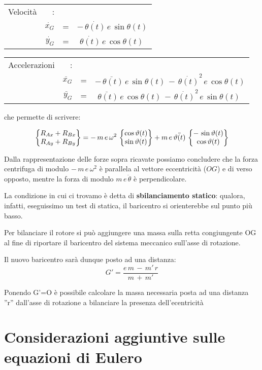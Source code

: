 \begin{minipage}{.5\textwidth}
\begin{tabular}{lrcl}
Velocità&:&&\\
&$\dot{x_G}$&=&$-\,\dot{\theta(t)}\,e\,\sin{\theta(t)}$\\
&$\dot{y_G}$&=&$\,\,\dot{\theta(t)}\,e\,\cos{\theta(t)}$\\
\end{tabular}
\end{minipage}
\hfill
\begin{minipage}{.5\textwidth}
\begin{tabular}{lrcl}
Accelerazioni&:&&\\
&$\ddot{x_G}$&=&$-\,\ddot{\theta(t)}\,e\,\sin{\theta(t)}\,-\,\dot{\theta(t)}^2\,e\,\cos{\theta(t)}$\\
&$\ddot{y_G}$&=&$\,\,\ddot{\theta(t)}\,e\,\cos{\theta(t)}\,-\,\dot{\theta(t)}^2\,e\,\sin{\theta(t)}$
\end{tabular}
\end{minipage}
\vspace{1mm}

che permette di scrivere:

\[
\begin{Bmatrix}R_{Ax} + R_{Bx}\\R_{Ay} + R_{By}\end{Bmatrix} = -\,m\,e\,\omega^2\,\begin{Bmatrix}\cos{\vartheta(t)}\\\sin{\vartheta(t)}\end{Bmatrix} + m\,e\,\ddot{\vartheta(t)}\,\begin{Bmatrix}-\,\sin{\vartheta(t)}\\\cos{\vartheta(t)}\end{Bmatrix}
\]

Dalla rappresentazione delle forze sopra ricavate possiamo concludere che la forza centrifuga di modulo $-\,m \,e\,\omega^2$ è parallela al vettore eccentricità ($OG$) e di verso opposto, mentre la forza di modulo $m\,e\,\ddot{\theta}$ è perpendicolare.

La condizione in cui ci trovamo è detta di \textbf{sbilanciamento statico}: qualora, infatti, eseguissimo un test di statica, il baricentro si orienterebbe sul punto più basso.

Per bilanciare il rotore si può aggiungere una massa sulla retta congiungente OG al fine di riportare il baricentro del sistema meccanico sull'asse di rotazione.

Il nuovo baricentro sarà dunque posto ad una distanza:
\[G' = \dfrac{e\,m\,-\,m'\,r}{m\,+\,m'}\]

Ponendo G'=O è possibile calcolare la massa necessaria posta ad una distanza ''r'' dall'asse di rotazione a bilanciare la presenza dell'ecentricità

\section{Considerazioni aggiuntive sulle equazioni di Eulero}

